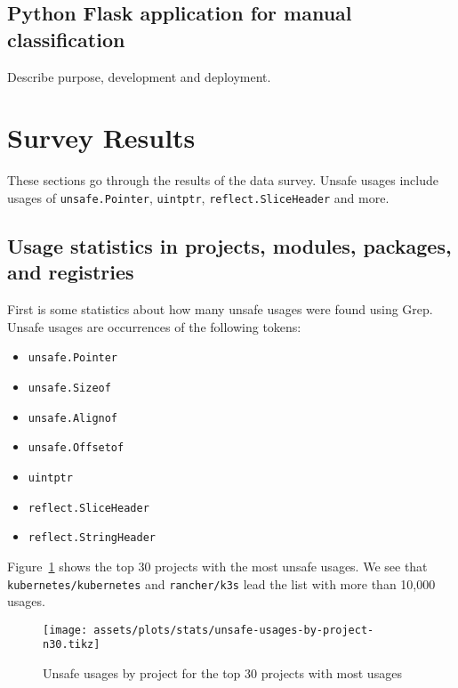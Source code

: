 \subsection{Python Flask application for manual classification}\label{subsec:survey-classification}

Describe purpose, development and deployment.



\section{Survey Results}\label{sec:survey-results}

These sections go through the results of the data survey.
Unsafe usages include usages of \texttt{unsafe.Pointer}, \texttt{uintptr}, \texttt{reflect.SliceHeader} and more.



\subsection{Usage statistics in projects, modules, packages, and registries}\label{subsec:results-stats}

First is some statistics about how many unsafe usages were found using Grep.
Unsafe usages are occurrences of the following tokens:

\begin{itemize}
    \item \texttt{unsafe.Pointer}
    \item \texttt{unsafe.Sizeof}
    \item \texttt{unsafe.Alignof}
    \item \texttt{unsafe.Offsetof}
    \item \texttt{uintptr}
    \item \texttt{reflect.SliceHeader}
    \item \texttt{reflect.StringHeader}
\end{itemize}

Figure~\ref{fig:unsafe-usages-by-project-n30} shows the top 30 projects with the most unsafe usages.
We see that \texttt{kubernetes/kubernetes} and \texttt{rancher/k3s} lead the list with more than 10,000 usages.

\begin{figure}[ht]
    \centering
    {\scriptsize \texttt{[image: assets/plots/stats/unsafe-usages-by-project-n30.tikz]}}
    \caption{Unsafe usages by project for the top 30 projects with most usages}
    \label{fig:unsafe-usages-by-project-n30}
\end{figure}


